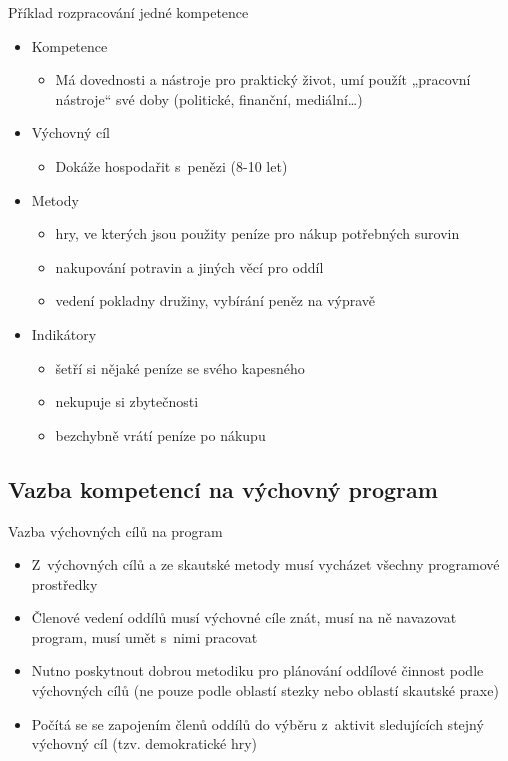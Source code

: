 \documentclass[compress,utf8,xcolor=dvipsnames]{beamer}
\begin{document}
\begin{frame}{Příklad rozpracování jedné kompetence}
\begin{itemize}
\item Kompetence
 \begin{itemize}
 \item Má dovednosti a nástroje pro praktický život, umí použít „pracovní nástroje“ své doby (politické, finanční, mediální\ldots)
 \end{itemize}
\item Výchovný cíl
 \begin{itemize}
 \item Dokáže hospodařit s penězi (8-10 let)
 \end{itemize}
\item Metody
 \begin{itemize}
 \item hry, ve kterých jsou použity peníze pro nákup potřebných surovin
 \item nakupování potravin a jiných věcí pro oddíl
 \item vedení pokladny družiny, vybírání peněz na výpravě
 \end{itemize}
\item Indikátory
\begin{itemize}
 \item šetří si nějaké peníze se svého kapesného
 \item nekupuje si zbytečnosti
 \item bezchybně vrátí peníze po nákupu
\end{itemize}
\end{itemize}
\end{frame}

\subsection{Vazba kompetencí na výchovný program}

\begin{frame}{Vazba výchovných cílů na program}
\begin{itemize}
\item Z~výchovných cílů a ze skautské metody musí vycházet všechny programové prostředky
\item Členové vedení oddílů musí výchovné cíle znát, musí na ně navazovat program, musí umět s~nimi pracovat
\item Nutno poskytnout dobrou metodiku pro plánování oddílové činnost podle výchovných cílů (ne pouze podle oblastí stezky nebo oblastí skautské praxe)
\item Počítá se se zapojením členů oddílů do výběru z~aktivit sledujících stejný výchovný cíl (tzv. demokratické hry)
\end{itemize}
\end{frame}
\end{document}
